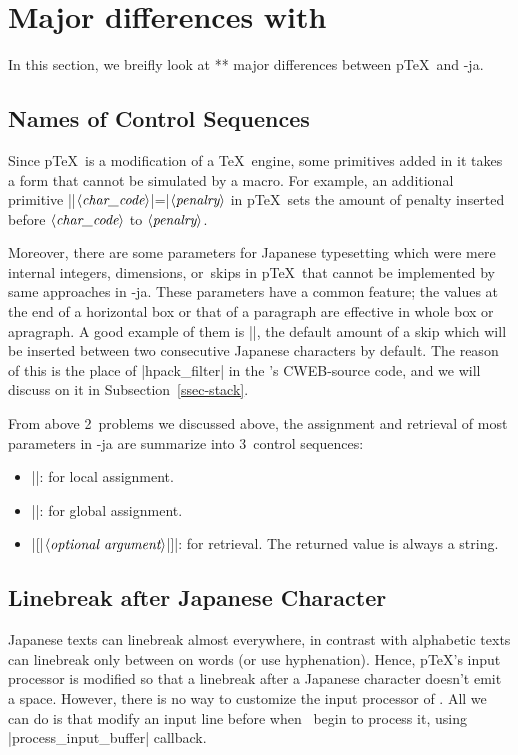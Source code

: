 \documentclass{ajt}
\begin{document}
\section{Major differences with \pTeX}
In this section, we breifly look at ** major differences between p\TeX\ and \LuaTeX-ja.

\subsection{Names of Control Sequences}
Since p\TeX\ is a modification of a \TeX\ engine, some primitives added in it takes a form that cannot be simulated by a macro.
For example, an additional primitive |\prebreakpenalty|$\langle\hbox{\it
char\_code}\rangle$|=|$\langle\hbox{\it penalry}\rangle$ in p\TeX\ sets the
amount of penalty inserted before $\langle\hbox{\it char\_code}\rangle$
to $\langle\hbox{\it penalry}\rangle$.

Moreover, there are some parameters for Japanese typesetting which were
mere internal integers, dimensions, or~skips in p\TeX\ that cannot be
implemented by same approaches in \LuaTeX-ja.  These parameters have a
common feature; the values at the end of a horizontal box or that of a
paragraph are effective in whole box or apragraph.  A good example of
them is |\kanjiskip|, the default amount of a skip which will be
inserted between two consecutive Japanese characters by default.  The
reason of this is the place of |hpack_filter| in the \LuaTeX's
CWEB-source code, and we will discuss on it in
Subsection~\ref{ssec-stack}.

From above 2~problems we discussed above, the assignment and retrieval
of most parameters in \LuaTeX-ja are summarize into 3~control sequences:
\begin{itemize}
\item ||: for local
      assignment.
\item |\ltjglobalsetparameter|: for global assignment.
\item |[{|$\langle\hbox{\it optional
      argument}\rangle$|}]|: for retrieval. The returned value is always
      a string.
\end{itemize}

\subsection{Linebreak after Japanese Character}
\label{ssec-line} 
Japanese texts can linebreak almost everywhere, in contrast with
alphabetic texts can linebreak only between on words (or use
hyphenation). Hence, p\TeX's input processor is modified so that a
linebreak after a Japanese character doesn't emit a space. However,
there is no way to customize the input processor of \LuaTeX. All we can
do is that modify an input line before when \LuaTeX\ begin to process
it, using |process_input_buffer| callback.
\end{document}
